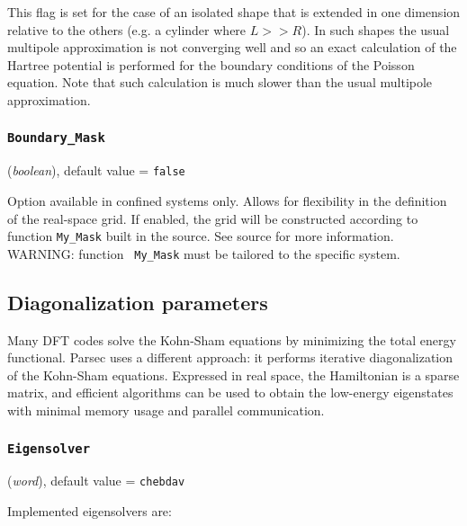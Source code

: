 \documentclass{article}
\begin{document}
This flag is set for the case of an isolated shape that is extended 
in one dimension relative to the others (e.g. a cylinder where $L >> R$). 
In such shapes the usual multipole approximation is not converging well 
and so an exact calculation of the Hartree potential is performed for 
the boundary conditions of the Poisson equation. Note that such calculation 
is much slower than the usual multipole approximation.
   
\subsubsection{\tt Boundary\_Mask 
\label{BoundaryMask}}
({\it boolean}),
default value = {\tt false }

Option available in confined systems only. Allows for flexibility in
the definition of the real-space grid. If enabled, the grid will be
constructed according to function {\tt My\_Mask} built in the
source. See source for more information. WARNING: function {\tt
  My\_Mask} must be tailored to the specific system.















\subsection{Diagonalization parameters}

Many DFT codes solve the Kohn-Sham equations by minimizing
the total energy functional. Parsec uses a different approach: it
performs iterative diagonalization of the Kohn-Sham
equations. Expressed in real space, the Hamiltonian is a sparse
matrix, and efficient algorithms can be used to obtain the low-energy
eigenstates with minimal memory usage and parallel communication.

\subsubsection{\tt Eigensolver 
\label{Eigensolver}}
({\it word}),
default value = {\tt chebdav }

Implemented eigensolvers are:
\end{document}
